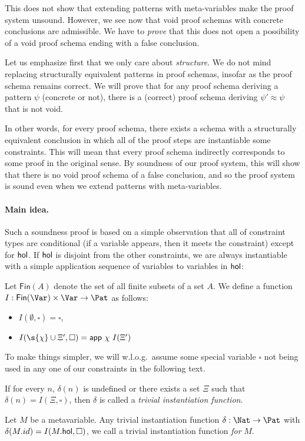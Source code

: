 \documentclass{mgr}
\begin{document}
This does not show that extending patterns with meta-variables make the proof system  unsound.
However, we see now that void proof schemas with concrete conclusions are admissible.
We have to \emph{prove} that this does not open a possibility of a void proof schema ending with a false conclusion.

Let us emphasize first that we only care about \emph{structure}.
We do not mind replacing structurally equivalent patterns in proof schemas, insofar as the proof schema remains correct.
We will prove that for any proof schema deriving a pattern $\psi$ (concrete or not), there is a (correct) proof schema deriving $\psi' \approx \psi$ that is not void.

In other words, for every proof schema, there exists a schema with a structurally equivalent conclusion in which all of the proof steps are instantiable \wrt some constraints.
This will mean that every proof schema indirectly corresponds to some proof in the original \ML sense.
By soundness of our proof system, this will show that there is no void proof schema of a false conclusion, and so the proof system is sound even when we extend patterns with meta-variables.

\paragraph{Main idea.} Such a soundness proof is based on a simple observation that all of constraint types are conditional (if a variable appears, then it meets the constraint) except for $\mathsf{hol}$.
If $\mathsf{hol}$ is disjoint from the other constraints, we are always instantiable with a simple application sequence of variables to variables in $\mathsf{hol}$:
\begin{definition}
  Let $\mathsf{Fin}(A)$ denote the set of all finite subsets of a set $A$.
  We define a function $I : \mathsf{Fin}(\Var) \times \Var \to \Pat$ as follows:
  \begin{itemize}
    \item $I(\emptyset, \square) = \square$,
    \item $I(\s{\chi} \cup \Xi', \square) = \mathsf{app}\ \chi\ I(\Xi')$
  \end{itemize}
\end{definition}

To make things simpler, we will w.l.o.g.~assume some special variable $\square$ not being used in any one of our constraints in the following text.

\begin{definition}
  If for every $n$, $\delta(n)$ is undefined or there exists a set $\Xi$ such that $\delta(n) = I(\Xi, \square)$, then $\delta$ is called a \emph{trivial instantiation function}.
\end{definition}
\begin{definition}
  Let $M$ be a metavariable.
  Any trivial instantiation function $\delta : \Nat \to \Pat$ with $\delta(M.id) = I(M.\mathsf{hol}, \square)$, we call a trivial instantiation function  \emph{for} $M$.
\end{definition}
\end{document}
